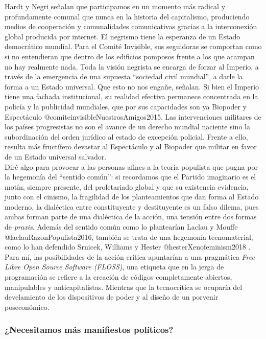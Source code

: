 \documentclass[
]{article}
\begin{document}
Hardt y Negri señalan que participamos en un momento más radical y
profundamente comunal que nunca en la historia del capitalismo,
produciendo medios de cooperación y comunalidades comunicativas gracias
a la interconexión global producida por internet. El negrismo tiene la
esperanza de un Estado democrático mundial. Para el Comité Invisible,
sus seguidoras se comportan como si no entendieran que dentro de los
edificios pomposos frente a los que acampan no hay realmente nada. Toda
la visión negrista se encarga de forzar al Imperio, a través de la
emergencia de una supuesta ``sociedad civil mundial'', a darle la forma
a un Estado universal. Que esto no nos engañe, señalan. Si bien el
Imperio tiene una fachada institucional, su realidad efectiva permanece
concentrada en la policía y la publicidad mundiales, que por sus
capacidades son ya Biopoder y Espectáculo
@comiteinvisibleNuestrosAmigos2015. Las intervenciones militares de los
países progresistas no son el avance de un derecho mundial naciente sino
la subordinación del orden jurídico al estado de excepción policial.
Frente a ello, resulta más fructífero devastar al Espectáculo y al
Biopoder que militar en favor de un Estado universal salvador.\\
Diré algo para provocar a las personas afines a la teoría populista que
pugna por la hegemonía del ``sentido común'': si recordamos que el
Partido imaginario es el motín, siempre presente, del proletariado
global y que su existencia evidencia, junto con el cinismo, la
fragilidad de los planteamientos que dan forma al Estado moderno, la
dialéctica entre constituyente y destituyente es un falso dilema, pues
ambas forman parte de una dialéctica de la acción, una tensión entre dos
formas de \emph{praxis}. Además del sentido común como lo plantearían
Laclau y Mouffe @laclauRazonPopulista2016, también se trata de una
hegemonía tecnomaterial, como lo han defendido Srnicek, Williams y
Hester @hesterXenofeminism2018 . Para mí, las posibilidades de la acción
crítica apuntarían a una pragmática \emph{Free Libre Open Source
Software (FLOSS)}, una etiqueta que en la jerga de programación se
refiere a la creación de códigos completamente abiertos, manipulables y
anticapitalistas. Mientras que la tecnocrítica se ocuparía del
develamiento de los dispositivos de poder y al diseño de un porvenir
poseconómico.

\hypertarget{necesitamos-muxe1s-manifiestos-poluxedticos}{%
\subsubsection{¿Necesitamos más manifiestos
políticos?}\label{necesitamos-muxe1s-manifiestos-poluxedticos}}
\end{document}
